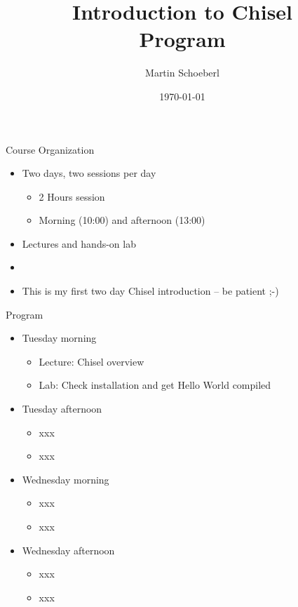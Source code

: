 \documentclass[xcolor=pdflatex,dvipsnames,table]{beamer}
\title{Introduction to Chisel\\Program}
\author{Martin Schoeberl}
\date{\today}
\institute{DTU Compute}
\begin{document}
\begin{frame}
\titlepage
\end{frame}


\begin{frame}[fragile]{Course Organization}
\begin{itemize}
\item Two days, two sessions per day
\begin{itemize}
\item 2 Hours session
\item Morning (10:00) and afternoon (13:00)
\end{itemize}
\item Lectures and hands-on lab
\item 
\item This is my first two day Chisel introduction -- be patient ;-)
\end{itemize}
\end{frame}

\begin{frame}[fragile]{Program}
\begin{itemize}
\item Tuesday morning
\begin{itemize}
\item Lecture: Chisel overview
\item Lab: Check installation and get Hello World compiled
\end{itemize}
\item Tuesday afternoon
\begin{itemize}
\item xxx
\item xxx
\end{itemize}
\item Wednesday morning
\begin{itemize}
\item xxx
\item xxx
\end{itemize}
\item Wednesday afternoon
\begin{itemize}
\item xxx
\item xxx
\end{itemize}
\end{itemize}
\end{frame}
\end{document}
